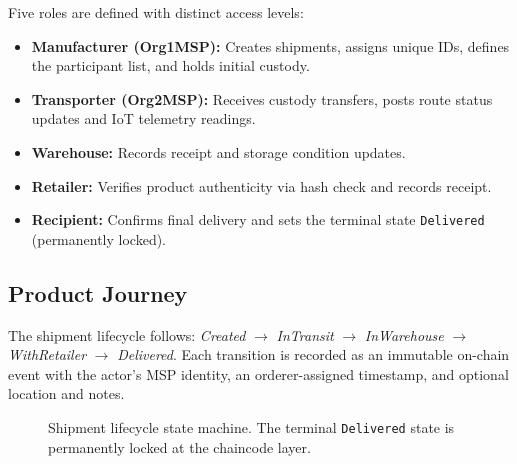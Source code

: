 \documentclass[conference]{IEEEtran}
\begin{document}
Five roles are defined with distinct access levels:

\begin{itemize}
  \item \textbf{Manufacturer (Org1MSP):} Creates shipments, assigns unique
    IDs, defines the participant list, and holds initial custody.
  \item \textbf{Transporter (Org2MSP):} Receives custody transfers, posts
    route status updates and IoT telemetry readings.
  \item \textbf{Warehouse:} Records receipt and storage condition updates.
  \item \textbf{Retailer:} Verifies product authenticity via hash check and
    records receipt.
  \item \textbf{Recipient:} Confirms final delivery and sets the terminal
    state \texttt{Delivered} (permanently locked).
\end{itemize}

\subsection{Product Journey}

The shipment lifecycle follows:
\textit{Created} $\rightarrow$ \textit{InTransit} $\rightarrow$
\textit{InWarehouse} $\rightarrow$ \textit{WithRetailer} $\rightarrow$
\textit{Delivered}.
Each transition is recorded as an immutable on-chain event with the actor's
MSP identity, an orderer-assigned timestamp, and optional location and notes.

\begin{figure}[!t]
\centering
{}
\caption{Shipment lifecycle state machine. The terminal \texttt{Delivered}
state is permanently locked at the chaincode layer.}
\label{fig:lifecycle}
\end{figure}
\end{document}

